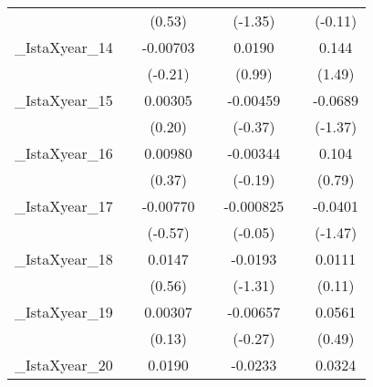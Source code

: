 {\begin{tabular}{l*{6}{c}}
            &                     &      (0.53)         &                     &     (-1.35)         &                     &     (-0.11)         \\
[1em]
\_IstaXyear\_14&                     &    -0.00703         &                     &      0.0190         &                     &       0.144         \\
            &                     &     (-0.21)         &                     &      (0.99)         &                     &      (1.49)         \\
[1em]
\_IstaXyear\_15&                     &     0.00305         &                     &    -0.00459         &                     &     -0.0689         \\
            &                     &      (0.20)         &                     &     (-0.37)         &                     &     (-1.37)         \\
[1em]
\_IstaXyear\_16&                     &     0.00980         &                     &    -0.00344         &                     &       0.104         \\
            &                     &      (0.37)         &                     &     (-0.19)         &                     &      (0.79)         \\
[1em]
\_IstaXyear\_17&                     &    -0.00770         &                     &   -0.000825         &                     &     -0.0401         \\
            &                     &     (-0.57)         &                     &     (-0.05)         &                     &     (-1.47)         \\
[1em]
\_IstaXyear\_18&                     &      0.0147         &                     &     -0.0193         &                     &      0.0111         \\
            &                     &      (0.56)         &                     &     (-1.31)         &                     &      (0.11)         \\
[1em]
\_IstaXyear\_19&                     &     0.00307         &                     &    -0.00657         &                     &      0.0561         \\
            &                     &      (0.13)         &                     &     (-0.27)         &                     &      (0.49)         \\
[1em]
\_IstaXyear\_20&                     &      0.0190         &                     &     -0.0233         &                     &      0.0324         \\

\end{tabular}}
